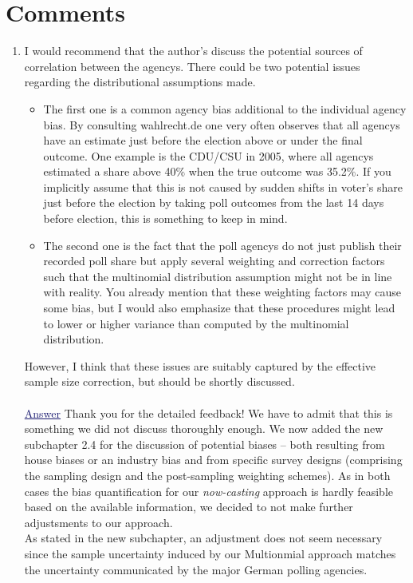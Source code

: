 \documentclass{scrartcl}
\newcommand{\blue}[1]{\textcolor{MidnightBlue}{\underline{\textcolor{MidnightBlue}{#1}}}}
\begin{document}
\section*{Comments}
\begin{enumerate}
  \item I would recommend that the author's discuss the potential sources of correlation between the agencys. There could be two potential issues regarding the 
  distributional assumptions made.
  \begin{itemize}
    \item The first one is a common agency bias additional to the individual agency bias. By consulting wahlrecht.de one very often observes that all agencys have an estimate just before the election above or under the final outcome. One example is the CDU/CSU in 2005, where all agencys estimated a share above 40\% when the true outcome was 35.2\%. If you implicitly assume that this is not caused by sudden shifts in voter's share just before the election by taking poll outcomes from the last 14 days before election, this is something to keep in mind.
    \item The second one is the fact that the poll agencys do not just publish their recorded poll share but apply several weighting and correction factors such that the multinomial distribution assumption might not be in line with reality. You already mention that these weighting factors may cause some bias, but I would also emphasize that these procedures might lead to lower or higher variance than computed by the multinomial distribution.
  \end{itemize}
  However, I think that these issues are suitably captured by the effective sample size correction, but should be shortly discussed.
  \\ \\
  \blue{Answer} Thank you for the detailed feedback! We have to admit that this is something we did not discuss
thoroughly enough. We now added the new subchapter 2.4 for the discussion of potential biases -- both resulting from house biases or an industry bias and from specific survey designs (comprising the sampling design and the post-sampling weighting schemes). As in both cases the bias quantification for our \emph{now-casting} approach is hardly feasible based on the available information, we decided to not make further adjustsments to our approach.\\
As stated in the new subchapter, an adjustment does not seem necessary since the sample uncertainty induced by our Multionmial approach matches the uncertainty communicated by the major German polling agencies.


\end{enumerate}
\end{document}
